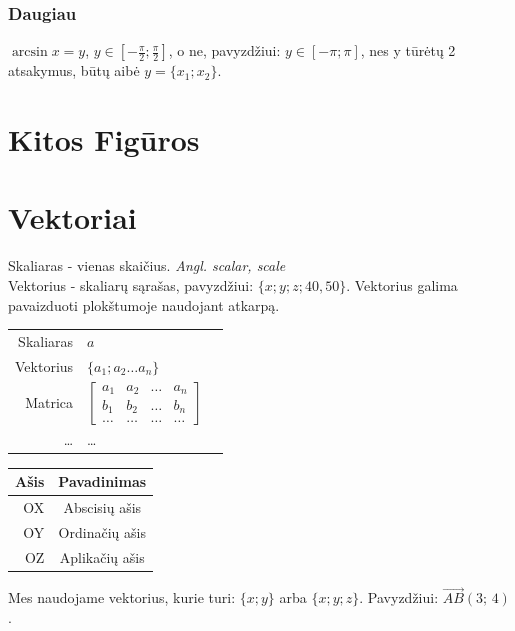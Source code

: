 \documentclass[fleqn]{article} %
\begin{document}
\subsubsection{Daugiau}

$\arcsin x = y$, $y \in [-\frac{\pi}{2}; \frac{\pi}{2}]$, o ne, pavyzdžiui: $y \in [-\pi; \pi]$, nes y tūrėtų 2 atsakymus, būtų aibė $y = \{x_1; x_2\}$.


\section{Kitos Figūros}

\section{Vektoriai}

Skaliaras - vienas skaičius. \textit{Angl. scalar, scale} \\
Vektorius - skaliarų sąrašas, pavyzdžiui: $\{x; y; z; 40, 50\}$. Vektorius galima pavaizduoti plokštumoje naudojant atkarpą.

\begin{table}[h]
    \begin{tabular}{rll}
        Skaliaras & $a$ \\
        Vektorius & $\{a_1; a_2 \dots a_n\}$\\
        Matrica   & $\begin{bmatrix}
            a_1 & a_2 & \dots & a_n \\
            b_1 & b_2 & \dots & b_n \\
            \dots & \dots & \dots & \dots
        \end{bmatrix}$ \\
        \dots & \dots
    \end{tabular}
    \hspace{40mm}
    \begin{tabular}{rc}
        Ašis & Pavadinimas \\ \hline
        OX & Abscisių ašis \\
        OY & Ordinačių ašis \\
        OZ & Aplikačių ašis
    \end{tabular}
\end{table}
Mes naudojame vektorius, kurie turi: $\{x; y\}$ arba $\{x; y; z\}$. Pavyzdžiui: $\vec{AB}(3;\,4)$.
\end{document}
